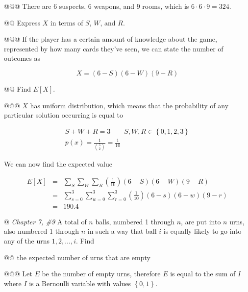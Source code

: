 \documentclass[11pt]{article}\usepackage[]{graphicx}\usepackage[]{xcolor}
\begin{document}
\begin{easylist}[enumerate]
    @@@ There are 6 suspects, 6 weapons, and 9 rooms, which is $6 \cdot 6 \cdot 9 = 324$.

    @@ Express $X$ in terms of $S$, $W$, and $R$.

    @@@ If the player has a certain amount of knowledge about the game, represented by how many cards they've seen, we
    can state the number of outcomes as

    \begin{equation}
        X = \left( 6 - S \right)\left( 6 - W \right)\left( 9 - R \right)
    \end{equation}

    @@ Find $E[X]$.

    @@@ $X$ has uniform distribution, which means that the probability of any particular solution occurring is equal to

    \begin{equation}
        \begin{aligned}
            S + W + R = 3 \qquad S,W,R \in \left\{ 0, 1, 2, 3 \right\}\\
            p(x) = \frac{1}{\binom{5}{2}} = \frac{1}{10}
        \end{aligned}
    \end{equation}

    We can now find the expected value

    \begin{equation}
        \begin{aligned}
            E[X] &=& \sum\limits_S
                       \sum\limits_W
                       \sum\limits_R
                       \left( \frac{1}{10} \right)(6-S)(6-W)(9-R)\\
                 &=& \sum_{s=0}^3
                       \sum_{w=0}^3
                       \sum_{r=0}^3
                       \left( \frac{1}{10} \right)(6-s)(6-w)(9-r)\\
                &=& 190.4
        \end{aligned}
    \end{equation}

    @ \textit{Chapter 7, \#9} A total of $n$ balls, numbered 1 through $n$, are put into $n$ urns, also numbered 1
    through $n$ in such a way that ball $i$ is equally likely to go into any of the urns $1, 2, \ldots, i$. Find

    @@ the expected number of urns that are empty

    @@@ Let $E$ be the number of empty urns, therefore $E$ is equal to the sum of $I$ where $I$ is a Bernoulli variable
    with values $\left\{ 0,1 \right\}$.


\end{easylist}
\end{document}
